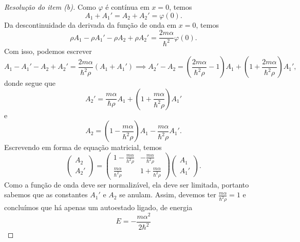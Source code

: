 \begin{proof}[Resolução do item (b)]
    Como \(\varphi\) é contínua em \(x = 0\), temos
    \begin{equation*}
        A_1 + A_1' = A_2 + A_2' = \varphi(0).
    \end{equation*}
    Da descontinuidade da derivada da função de onda em \(x = 0\), temos
    \begin{equation*}
        \rho A_1 - \rho A_1' - \rho A_2 + \rho A_2' = \frac{2m \alpha}{\hbar^2} \varphi(0).
    \end{equation*}
    Com isso, podemos escrever
    \begin{equation*}
        A_1 - A_1' - A_2 + A_2' = \frac{2m \alpha}{\hbar^2 \rho} (A_1 + A_1') \implies A_2' - A_2 = \left(\frac{2m \alpha}{\hbar^2 \rho} - 1\right)A_1 + \left(1 + \frac{2m \alpha}{\hbar^2 \rho}\right)A_1',
    \end{equation*}
    donde segue que
    \begin{equation*}
        A_2' = \frac{m \alpha}{\hbar \rho} A_1 + \left(1 + \frac{m \alpha}{\hbar^2 \rho}\right)A_1'
    \end{equation*}
    e
    \begin{equation*}
        A_2 = \left(1 - \frac{m \alpha}{\hbar^2 \rho}\right) A_1 - \frac{m \alpha}{\hbar^2 \rho} A_1'.
    \end{equation*}
    Escrevendo em forma de equação matricial, temos
    \begin{equation*}
        \begin{pmatrix}
            A_2\\A_2'
        \end{pmatrix} =
        \begin{pmatrix}
            1 - \frac{m \alpha}{h^2 \rho} & - \frac{m \alpha}{\hbar^2 \rho}\\
            \frac{m \alpha}{\hbar^2 \rho} & 1 + \frac{m \alpha}{\hbar^2 \rho}
        \end{pmatrix}
        \begin{pmatrix}
            A_1\\A_1'
        \end{pmatrix}.
    \end{equation*}
    Como a função de onda deve ser normalizável, ela deve ser limitada, portanto sabemos que as constantes \(A_1'\) e \(A_2\) se anulam. Assim, devemos ter \(\frac{m \alpha}{\hbar^2 \rho} = 1\) e concluímos que há apenas um autoestado ligado, de energia
    \begin{equation*}
        E = - \frac{m \alpha^2}{2\hbar^2}
    \end{equation*}

\end{proof}
